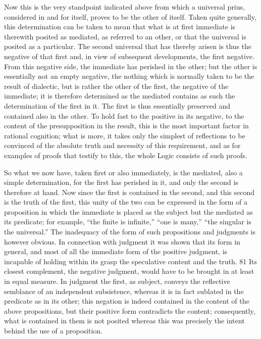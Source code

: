 Now this is the very standpoint indicated above from which a universal
prius, considered in and for itself, proves to be the other of itself. Taken quite
generally, this determination can be taken to mean that what is at first
immediate is therewith posited as mediated, as referred to an other, or
that the universal is posited as a particular. The second universal that has
thereby arisen is thus the negative of that first and, in view of subsequent
developments, the first negative. From this negative side, the immediate has
perished in the other; but the other is essentially not an empty negative, the
nothing which is normally taken to be the result of dialectic, but is rather
the other of the first, the negative of the immediate; it is therefore determined
as the mediated
 contains as such the determination of the first in it. The
first is thus essentially preserved and contained also in the other.
 To hold
fast to the positive in its negative, to the content of the presupposition in
the result, this is the most important factor in rational cognition; what
is more, it takes only the simplest of reflections to be convinced of the
absolute truth and necessity of this requirement, and as for examples of
proofs that testify to this, the whole Logic consists of such proofs.

So what we now have, taken first or also immediately, is the mediated,
also a simple determination, for the first has perished in it, and only the
second is therefore at hand. Now since the first is contained in the second,
and this second is the truth of the first, this unity of the two can be expressed
in the form of a proposition in which the immediate is placed as the subject
but the mediated as its predicate; for example, “the finite is infinite,” “one
is many,” “the singular is the universal.” The inadequacy of the form
of such propositions and judgments is however obvious. In connection
with judgment it was shown that its form in general, and most of all the
immediate form of the positive judgment, is incapable of holding within its
grasp the speculative content and the truth. 81 Its closest complement, the
negative judgment, would have to be brought in at least in equal measure.
In judgment the first, as subject, conveys the reflective semblance of an
independent subsistence, whereas it is in fact sublated in the predicate as
in its other; this negation is indeed contained in the content of the above
propositions, but their positive form contradicts the content; consequently,
what is contained in them is not posited
 whereas this was precisely the
intent behind the use of a proposition.

